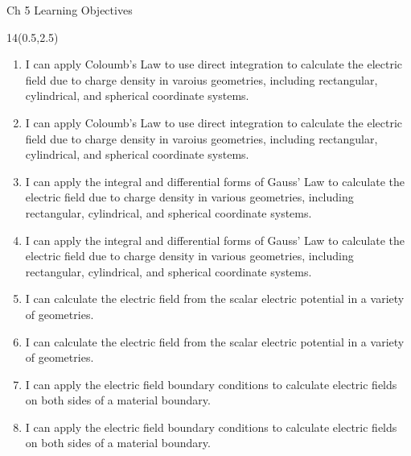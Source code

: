 \def\obja{ I can apply Coloumb's Law to use direct integration to calculate the electric field due to charge density in varoius geometries, including rectangular, cylindrical, and spherical coordinate systems. }
\def\objb{ I can apply the integral and differential forms of Gauss' Law to calculate the electric field due to charge density in various geometries, including rectangular, cylindrical, and spherical coordinate systems. }
\def\objc{ I can calculate the electric field from the scalar electric potential in a variety of geometries.}
\def\objd{ I can apply the electric field boundary conditions to calculate electric fields on both sides of a material boundary. }
\begin{frame}{Ch 5 Learning Objectives}
	\begin{textblock}{14}(0.5,2.5)
	\begin{myblock}[0.95]{}
	\begin{small}
	\begin{enumerate}[{5}.1]
		\ifnum{}
			\item \alert{ \obja }
		\else 
			\item \obja
		\fi 
		\ifnum{}
			\item \alert{ \objb }
		\else 
			\item \objb
		\fi 
		\ifnum{}
			\item \alert{ \objc }
		\else 
			\item \objc
		\fi 
		\ifnum{}
			\item \alert{ \objd }
		\else 
			\item \objd
		\fi 	
	\end{enumerate}
	\end{small}
	\end{myblock}
	\end{textblock}
\end{frame}